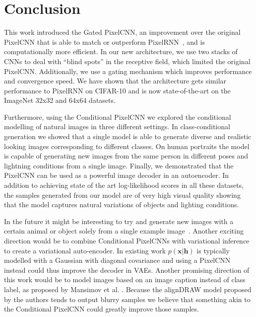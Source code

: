 \documentclass{article}
\renewcommand{\vec}{\mathbf}
\begin{document}
 \section{Conclusion}


This work introduced the Gated PixelCNN, an improvement over the original PixelCNN that is able to match or outperform PixelRNN~\cite{van2016pixel}, and is computationally more efficient. In our new architecture, we use two stacks of CNNs to deal with ``blind spots'' in the receptive field, which limited the original PixelCNN. Additionally, we use a gating mechanism which improves performance and convergence speed. We have shown that the architecture gets similar performance to PixelRNN on CIFAR-10 and is now state-of-the-art on the ImageNet 32x32 and 64x64 datasets.

Furthermore, using the Conditional PixelCNN we explored the conditional modelling of natural images in three different settings. In class-conditional generation we showed that a single model is able to generate diverse and realistic looking images corresponding to different classes. On human portraits the model is capable of generating new images from the same person in different poses and lightning conditions from a single image. Finally, we demonstrated that the PixelCNN can be used as a powerful image decoder in an autoencoder. In addition to achieving state of the art log-likelihood scores in all these datasets, the samples generated from our model are of very high visual quality showing that the model captures natural variations of objects and lighting conditions.
 
In the future it might be interesting to try and generate new images with a certain animal or object solely from a single example image~\cite{rezende2016one,salakhutdinov2013learning}. Another exciting direction would be to combine Conditional PixelCNNs with variational inference to create a variational auto-encoder. In existing work $p(\vec{x}|\vec{h})$ is typically modelled with a Gaussian with diagonal covariance and using a PixelCNN instead could thus improve the decoder in VAEs. Another promising direction of this work would be to model images based on an image caption instead of class label, as proposed by Mansimov et al. \cite{mansimov2015generating}. Because the alignDRAW model proposed by the authors tends to output blurry samples we believe that something akin to the Conditional PixelCNN could greatly improve those samples. 
\small{
  
  
}
\end{document}
